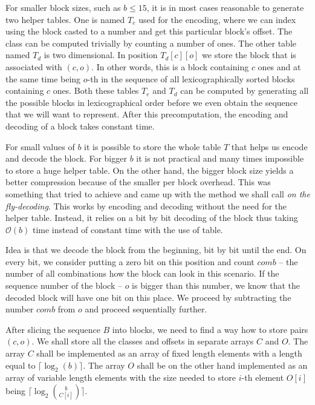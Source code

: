 For smaller block sizes, such as $b\leq 15$, it is in most cases reasonable to
generate two helper tables. One is named $T_e$ used for the encoding, where we can
index using the block casted to a number and get this particular block's offset.
The class can be computed trivially by counting a number of ones. The other table
named $T_d$ is two dimensional. In position $T_d[c][o]$ we store the block that
is associated with $(c, o)$. In other words, this is a block containing $c$ ones
and at the same time being $o$-th in the sequence of all lexicographically sorted
blocks containing $c$ ones. Both these tables $T_e$ and $T_d$ can be computed
by generating all the possible blocks in lexicographical order before we even
obtain the sequence that we will want to represent. After this precomputation,
the encoding and decoding of a block takes constant time.

For small values of $b$ it is possible to store the whole table $T$ that helps us
encode and decode the block. For bigger $b$ it is not practical and many times
impossible to store a huge helper table. On the other hand, the bigger block size
yields a better compression because of the smaller per block overhead. This was
something that \cite{navarro2012fast} tried to achieve and came up with the method
we shall call \textit{on the fly-decoding}. This works by encoding and decoding without
the need for the helper table. Instead, it relies on a bit by bit decoding of the block
thus taking $\mathcal{O}(b)$ time instead of constant time with the use of table.

Idea is that we decode the block from the beginning, bit by bit until the end. On every bit,
we consider putting a zero bit on this position and count $comb$ -- the number of all
combinations how the block can look in this scenario. If the sequence number of the block --
$o$ is bigger than this number, we know that the decoded block will have one bit on this place.
We proceed by subtracting the number $comb$ from $o$ and proceed sequentially further.

After slicing the sequence $B$ into blocks, we need to find a way how to store pairs $(c, o)$.
We shall store all the classes and offsets in separate arrays $C$ and $O$. The array $C$ shall
be implemented as an array of fixed length elements with a length equal to
$\lceil \log_2(b)\rceil$. The array $O$ shall be on the other hand implemented as an array of
variable length elements with the size needed to store $i$-th element $O[i]$ being
$\lceil \log_2{b\choose C[i]}\rceil$.

